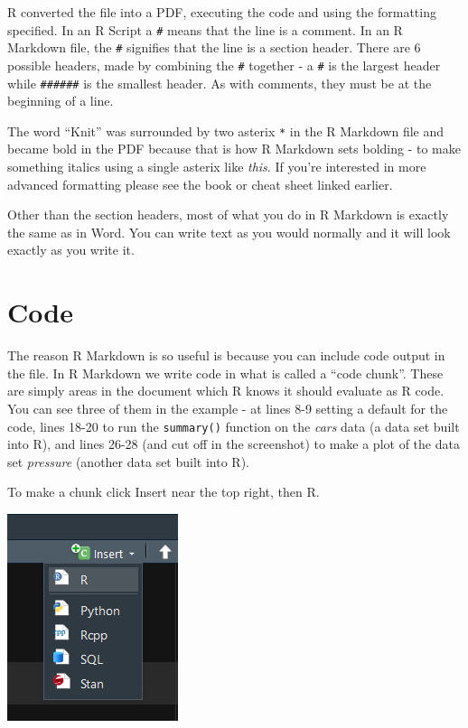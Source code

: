\documentclass[
]{krantz}
\begin{document}
R converted the file into a PDF, executing the code and using the formatting specified. In an R Script a \texttt{\#} means that the line is a comment. In an R Markdown file, the \texttt{\#} signifies that the line is a section header. There are 6 possible headers, made by combining the \texttt{\#} together - a \texttt{\#} is the largest header while \texttt{\#\#\#\#\#\#} is the smallest header. As with comments, they must be at the beginning of a line.

The word ``Knit'' was surrounded by two asterix \texttt{*} in the R Markdown file and became bold in the PDF because that is how R Markdown sets bolding - to make something italics using a single asterix like \emph{this}. If you're interested in more advanced formatting please see the book or cheat sheet linked earlier.

Other than the section headers, most of what you do in R Markdown is exactly the same as in Word. You can write text as you would normally and it will look exactly as you write it.

\hypertarget{code-1}{%
\section{Code}\label{code-1}}

The reason R Markdown is so useful is because you can include code output in the file. In R Markdown we write code in what is called a ``code chunk''. These are simply areas in the document which R knows it should evaluate as R code. You can see three of them in the example - at lines 8-9 setting a default for the code, lines 18-20 to run the \texttt{summary()} function on the \emph{cars} data (a data set built into R), and lines 26-28 (and cut off in the screenshot) to make a plot of the data set \emph{pressure} (another data set built into R).

To make a chunk click Insert near the top right, then R.

\includegraphics{images/markdown3.PNG}
\end{document}
